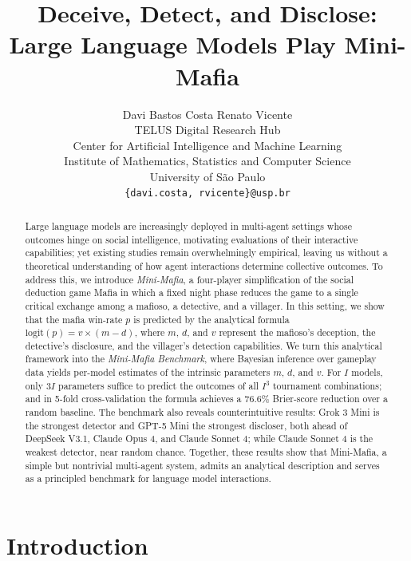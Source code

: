 \documentclass{article}
\title{Deceive, Detect, and Disclose: \\ Large Language Models Play Mini-Mafia}
\author{
  Davi Bastos Costa \quad Renato Vicente \\
  TELUS Digital Research Hub \\
  Center for Artificial Intelligence and Machine Learning \\
  Institute of Mathematics, Statistics and Computer Science\\ 
  University of S\~ao Paulo \\
  \texttt{\{davi.costa, rvicente\}@usp.br}
}
\begin{document}
\ifcolmsubmission
\linenumbers
\fi

\maketitle


\begin{abstract}
    Large language models are increasingly deployed in multi-agent settings whose outcomes hinge on social intelligence, motivating evaluations of their interactive capabilities; yet existing studies remain overwhelmingly empirical, leaving us without a theoretical understanding of how agent interactions determine collective outcomes. To address this, we introduce \textit{Mini-Mafia}, a four-player simplification of the social deduction game Mafia in which a fixed night phase reduces the game to a single critical exchange among a mafioso, a detective, and a villager. In this setting, we show that the mafia win-rate $p$ is predicted by the analytical formula $\text{logit}(p) = v \times (m - d)$, where $m$, $d$, and $v$ represent the mafioso's deception, the detective's disclosure, and the villager's detection capabilities. We turn this analytical framework into the \textit{Mini-Mafia Benchmark}, where Bayesian inference over gameplay data yields per-model estimates of the intrinsic parameters $m$, $d$, and $v$. For $I$ models, only $3I$ parameters suffice to predict the outcomes of all $I^3$ tournament combinations; and in 5-fold cross-validation the formula achieves a $76.6\%$ Brier-score reduction over a random baseline. The benchmark also reveals counterintuitive results: Grok 3 Mini is the strongest detector and GPT-5 Mini the strongest discloser, both ahead of DeepSeek V3.1, Claude Opus 4, and Claude Sonnet 4; while Claude Sonnet 4 is the weakest detector, near random chance. Together, these results show that Mini-Mafia, a simple but nontrivial multi-agent system, admits an analytical description and serves as a principled benchmark for language model interactions.
\end{abstract}


\section{Introduction}
\end{document}
